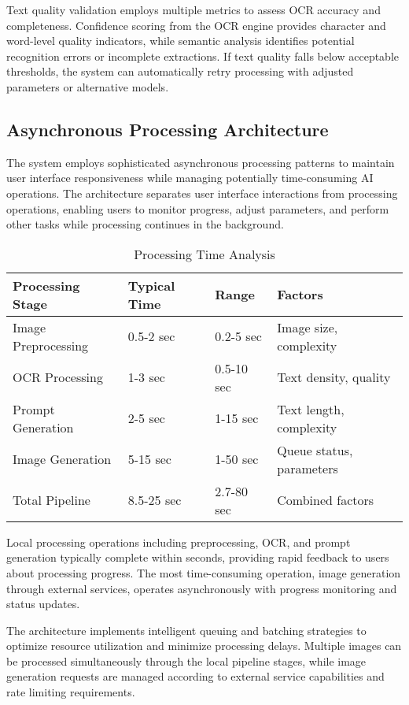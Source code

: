 Text quality validation employs multiple metrics to assess OCR accuracy and completeness. Confidence scoring from the OCR engine provides character and word-level quality indicators, while semantic analysis identifies potential recognition errors or incomplete extractions. If text quality falls below acceptable thresholds, the system can automatically retry processing with adjusted parameters or alternative models.

\subsection{Asynchronous Processing Architecture}

The system employs sophisticated asynchronous processing patterns to maintain user interface responsiveness while managing potentially time-consuming AI operations. The architecture separates user interface interactions from processing operations, enabling users to monitor progress, adjust parameters, and perform other tasks while processing continues in the background.

\begin{table}[H]
\centering
\caption{Processing Time Analysis}
\label{tab:processing_times}
{\begin{tabular}{llll}
\toprule
\textbf{Processing Stage} & \textbf{Typical Time} & \textbf{Range} & \textbf{Factors} \\
\midrule
Image Preprocessing & 0.5-2 sec & 0.2-5 sec & Image size, complexity \\
OCR Processing & 1-3 sec & 0.5-10 sec & Text density, quality \\
Prompt Generation & 2-5 sec & 1-15 sec & Text length, complexity \\
Image Generation & 5-15 sec & 1-50 sec & Queue status, parameters \\
Total Pipeline & 8.5-25 sec & 2.7-80 sec & Combined factors \\
\bottomrule
\end{tabular}}
\end{table}

Local processing operations including preprocessing, OCR, and prompt generation typically complete within seconds, providing rapid feedback to users about processing progress. The most time-consuming operation, image generation through external services, operates asynchronously with progress monitoring and status updates.

The architecture implements intelligent queuing and batching strategies to optimize resource utilization and minimize processing delays. Multiple images can be processed simultaneously through the local pipeline stages, while image generation requests are managed according to external service capabilities and rate limiting requirements.

